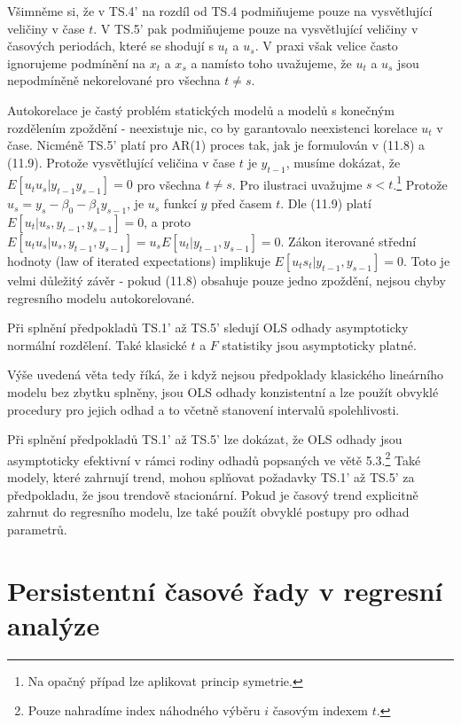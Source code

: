 Všimněme si, že v TS.4' na rozdíl od TS.4 podmiňujeme pouze na vysvětlující veličiny v čase $t$. V TS.5' pak podmiňujeme pouze na vysvětlující veličiny v časových periodách, které se shodují s $u_t$ a $u_s$. V praxi však velice často ignorujeme podmínění na $x_t$ a $x_s$ a namísto toho uvažujeme, že $u_t$ a $u_s$ jsou nepodmíněně nekorelované pro všechna $t \ne s$.

Autokorelace je častý problém statických modelů a modelů s konečným rozdělením zpoždění - neexistuje nic, co by garantovalo neexistenci korelace $u_t$ v čase. Nicméně TS.5' platí pro AR(1) proces tak, jak je formulován v (11.8) a (11.9). Protože vysvětlující veličina v čase $t$ je $y_{t - 1}$, musíme dokázat, že $E[u_t u_s | y_{t - 1} y_{s - 1}] = 0$ pro všechna $t \ne s$. Pro ilustraci uvažujme $s < t$.\footnote{Na opačný případ lze aplikovat princip symetrie.} Protože $u_s = y_s - \beta_0 - \beta_1 y_{s - 1}$, je $u_s$ funkcí $y$ před časem $t$. Dle (11.9) platí $E[u_t|u_s, y_{t - 1}, y_{s - 1}] = 0$, a proto $E[u_t u_s| u_s, y_{t - 1}, y_{s - 1}] = u_s E[u_t | y_{t - 1}, y_{s - 1}] = 0$. Zákon iterované střední hodnoty (law of iterated expectations) implikuje $E[u_t s_t | y_{t - 1}, y_{s - 1}] = 0$. Toto je velmi důležitý závěr - pokud (11.8) obsahuje pouze jedno zpoždění, nejsou chyby regresního modelu autokorelované.

\begin{theorem}
Při splnění předpokladů TS.1' až TS.5' sledují OLS odhady asymptoticky normální rozdělení. Také klasické $t$ a $F$ statistiky jsou asymptoticky platné.
  
\raggedleft{$\clubsuit$}
\end{theorem}

Výše uvedená věta tedy říká, že i když nejsou předpoklady klasického lineárního modelu bez zbytku splněny, jsou OLS odhady konzistentní a lze použít obvyklé procedury pro jejich odhad a to včetně stanovení intervalů spolehlivosti.

Při splnění předpokladů TS.1' až TS.5' lze dokázat, že OLS odhady jsou asymptoticky efektivní v rámci rodiny odhadů popsaných ve větě 5.3.\footnote{Pouze nahradíme index náhodného výběru $i$ časovým indexem $t$.} Také modely, které zahrnují trend, mohou splňovat požadavky TS.1' až TS.5' za předpokladu, že jsou trendově stacionární. Pokud je časový trend explicitně zahrnut do regresního modelu, lze také použít obvyklé postupy pro odhad parametrů.

\section{Persistentní časové řady v regresní analýze}

